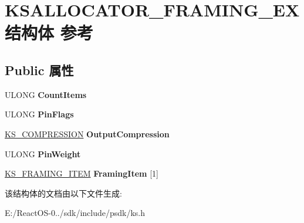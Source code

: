\hypertarget{struct_k_s_a_l_l_o_c_a_t_o_r___f_r_a_m_i_n_g___e_x}{}\section{K\+S\+A\+L\+L\+O\+C\+A\+T\+O\+R\+\_\+\+F\+R\+A\+M\+I\+N\+G\+\_\+\+E\+X结构体 参考}
\label{struct_k_s_a_l_l_o_c_a_t_o_r___f_r_a_m_i_n_g___e_x}
\subsection*{Public 属性}
\begin{DoxyCompactItemize}
\item 
\mbox{\label{struct_k_s_a_l_l_o_c_a_t_o_r___f_r_a_m_i_n_g___e_x_aefe19a295738563a5e0de301cf32f764}} 
U\+L\+O\+NG {\bfseries Count\+Items}
\item 
\mbox{\label{struct_k_s_a_l_l_o_c_a_t_o_r___f_r_a_m_i_n_g___e_x_a0afe8c8de7e36169d2e631f11a2630e8}} 
U\+L\+O\+NG {\bfseries Pin\+Flags}
\item 
\mbox{\label{struct_k_s_a_l_l_o_c_a_t_o_r___f_r_a_m_i_n_g___e_x_a01232f5efe7e2a715465637d92368ae0}} 
\hyperlink{struct_k_s___c_o_m_p_r_e_s_s_i_o_n}{K\+S\+\_\+\+C\+O\+M\+P\+R\+E\+S\+S\+I\+ON} {\bfseries Output\+Compression}
\item 
\mbox{\label{struct_k_s_a_l_l_o_c_a_t_o_r___f_r_a_m_i_n_g___e_x_affcf03feed631448f9c5ffb86569801a}} 
U\+L\+O\+NG {\bfseries Pin\+Weight}
\item 
\mbox{\label{struct_k_s_a_l_l_o_c_a_t_o_r___f_r_a_m_i_n_g___e_x_a9662357d782ff687285cdc1e628ae290}} 
\hyperlink{struct_k_s___f_r_a_m_i_n_g___i_t_e_m}{K\+S\+\_\+\+F\+R\+A\+M\+I\+N\+G\+\_\+\+I\+T\+EM} {\bfseries Framing\+Item} \mbox{[}1\mbox{]}
\end{DoxyCompactItemize}


该结构体的文档由以下文件生成\+:\begin{DoxyCompactItemize}
\item 
E\+:/\+React\+O\+S-\/0../sdk/include/psdk/ks.\+h\end{DoxyCompactItemize}
